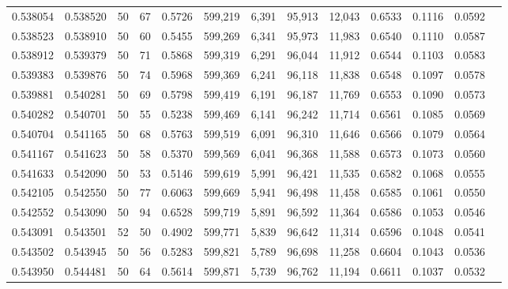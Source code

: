 \begin{tabular}{rrrrrrrrrrrrr}
0.538054 & 0.538520 &    50 &  67 &                                     0.5726 & 599,219 &   6,391 &  95,913 &  12,043 & 0.6533 & 0.1116 & 0.0592 \\
0.538523 & 0.538910 &    50 &  60 &                                     0.5455 & 599,269 &   6,341 &  95,973 &  11,983 & 0.6540 & 0.1110 & 0.0587 \\
0.538912 & 0.539379 &    50 &  71 &                                     0.5868 & 599,319 &   6,291 &  96,044 &  11,912 & 0.6544 & 0.1103 & 0.0583 \\
0.539383 & 0.539876 &    50 &  74 &                                     0.5968 & 599,369 &   6,241 &  96,118 &  11,838 & 0.6548 & 0.1097 & 0.0578 \\
0.539881 & 0.540281 &    50 &  69 &                                     0.5798 & 599,419 &   6,191 &  96,187 &  11,769 & 0.6553 & 0.1090 & 0.0573 \\
0.540282 & 0.540701 &    50 &  55 &                                     0.5238 & 599,469 &   6,141 &  96,242 &  11,714 & 0.6561 & 0.1085 & 0.0569 \\
0.540704 & 0.541165 &    50 &  68 &                                     0.5763 & 599,519 &   6,091 &  96,310 &  11,646 & 0.6566 & 0.1079 & 0.0564 \\
0.541167 & 0.541623 &    50 &  58 &                                     0.5370 & 599,569 &   6,041 &  96,368 &  11,588 & 0.6573 & 0.1073 & 0.0560 \\
0.541633 & 0.542090 &    50 &  53 &                                     0.5146 & 599,619 &   5,991 &  96,421 &  11,535 & 0.6582 & 0.1068 & 0.0555 \\
0.542105 & 0.542550 &    50 &  77 &                                     0.6063 & 599,669 &   5,941 &  96,498 &  11,458 & 0.6585 & 0.1061 & 0.0550 \\
0.542552 & 0.543090 &    50 &  94 &                                     0.6528 & 599,719 &   5,891 &  96,592 &  11,364 & 0.6586 & 0.1053 & 0.0546 \\
0.543091 & 0.543501 &    52 &  50 &                                     0.4902 & 599,771 &   5,839 &  96,642 &  11,314 & 0.6596 & 0.1048 & 0.0541 \\
0.543502 & 0.543945 &    50 &  56 &                                     0.5283 & 599,821 &   5,789 &  96,698 &  11,258 & 0.6604 & 0.1043 & 0.0536 \\
0.543950 & 0.544481 &    50 &  64 &                                     0.5614 & 599,871 &   5,739 &  96,762 &  11,194 & 0.6611 & 0.1037 & 0.0532 \\

\end{tabular}

